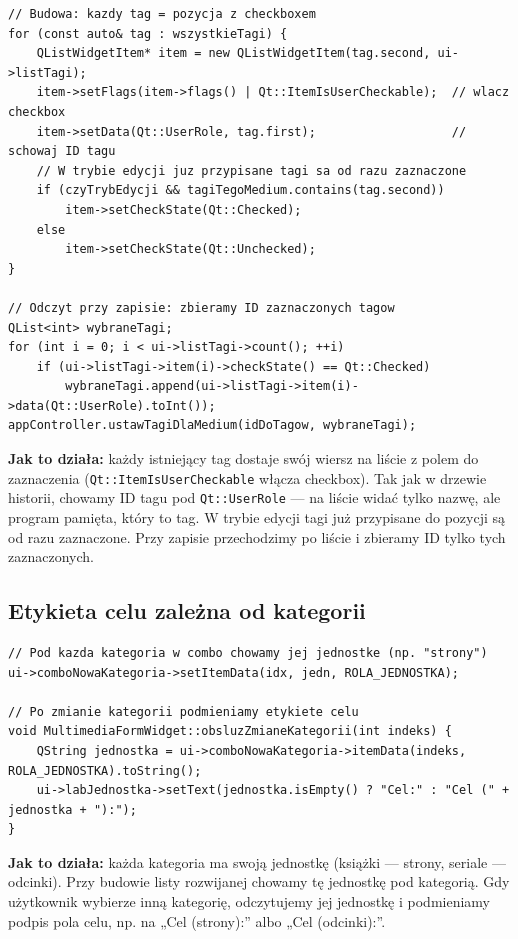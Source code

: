 \documentclass[11pt,a4paper]{article}
\begin{document}
\begin{lstlisting}[caption={Budowa listy i odczyt zaznaczonych tagów}]
// Budowa: kazdy tag = pozycja z checkboxem
for (const auto& tag : wszystkieTagi) {
    QListWidgetItem* item = new QListWidgetItem(tag.second, ui->listTagi);
    item->setFlags(item->flags() | Qt::ItemIsUserCheckable);  // wlacz checkbox
    item->setData(Qt::UserRole, tag.first);                   // schowaj ID tagu
    // W trybie edycji juz przypisane tagi sa od razu zaznaczone
    if (czyTrybEdycji && tagiTegoMedium.contains(tag.second))
        item->setCheckState(Qt::Checked);
    else
        item->setCheckState(Qt::Unchecked);
}

// Odczyt przy zapisie: zbieramy ID zaznaczonych tagow
QList<int> wybraneTagi;
for (int i = 0; i < ui->listTagi->count(); ++i)
    if (ui->listTagi->item(i)->checkState() == Qt::Checked)
        wybraneTagi.append(ui->listTagi->item(i)->data(Qt::UserRole).toInt());
appController.ustawTagiDlaMedium(idDoTagow, wybraneTagi);
\end{lstlisting}

\textbf{Jak to działa:} każdy istniejący tag dostaje swój wiersz na liście
z polem do zaznaczenia (\texttt{Qt::ItemIsUserCheckable} włącza checkbox).
Tak jak w drzewie historii, chowamy ID tagu pod \texttt{Qt::UserRole} ---
na liście widać tylko nazwę, ale program pamięta, który to tag.
W trybie edycji tagi już przypisane do pozycji są od razu zaznaczone.
Przy zapisie przechodzimy po liście i zbieramy ID tylko tych zaznaczonych.

\subsection{Etykieta celu zależna od kategorii}

\begin{lstlisting}[caption={Podpis celu zmienia się razem z jednostką kategorii}]
// Pod kazda kategoria w combo chowamy jej jednostke (np. "strony")
ui->comboNowaKategoria->setItemData(idx, jedn, ROLA_JEDNOSTKA);

// Po zmianie kategorii podmieniamy etykiete celu
void MultimediaFormWidget::obsluzZmianeKategorii(int indeks) {
    QString jednostka = ui->comboNowaKategoria->itemData(indeks, ROLA_JEDNOSTKA).toString();
    ui->labJednostka->setText(jednostka.isEmpty() ? "Cel:" : "Cel (" + jednostka + "):");
}
\end{lstlisting}

\textbf{Jak to działa:} każda kategoria ma swoją jednostkę (książki --- strony,
seriale --- odcinki). Przy budowie listy rozwijanej chowamy tę jednostkę pod
kategorią. Gdy użytkownik wybierze inną kategorię, odczytujemy jej jednostkę
i podmieniamy podpis pola celu, np. na „Cel (strony):” albo „Cel (odcinki):”.
\end{document}
